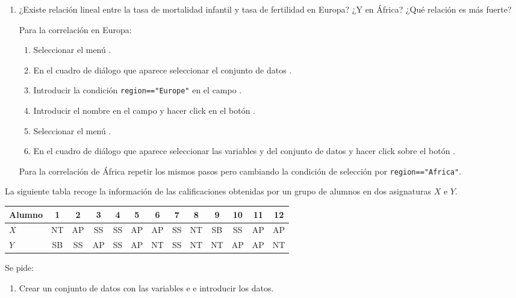 \begin{enumerate}[leftmargin=*]
{\begin{enumerate}
\item ¿Existe relación lineal entre la tasa de mortalidad infantil y tasa de fertilidad en Europa? ¿Y en África? ¿Qué relación es más fuerte?
\begin{indicacion}{
Para la correlación en Europa:
\begin{enumerate}
\item Seleccionar el menú .
\item En el cuadro de diálogo que aparece seleccionar el conjunto de datos .
\item Introducir la condición \lstinline{region=="Europe"} en el campo .
\item Introducir el nombre  en el campo  y hacer click en el botón .
\item Seleccionar el menú .
\item En el cuadro de diálogo que aparece seleccionar las variables  y
 del conjunto de datos  y hacer click sobre el botón .
\end{enumerate}
Para la correlación de África repetir los mismos pasos pero cambiando la condición de selección por
\lstinline{region=="Africa"}.
}
\end{indicacion}
\end{enumerate}


\item La siguiente tabla recoge la información de las calificaciones obtenidas por un grupo de alumnos en dos
asignaturas $X$ e $Y$.
\begin{center}
\begin{tabular}{lcccccccccccc}
Alumno & 1 & 2 & 3 & 4 & 5 & 6 & 7 & 8 & 9 & 10 & 11 & 12\\
\hline
$X$ & NT & AP & SS & SS & AP & AP & SS & NT & SB & SS & AP & AP\\
$Y$ & SB & SS & AP & SS & AP & NT & SS & NT & NT & AP & AP & NT
\end{tabular}
\end{center}
Se pide:
\begin{enumerate}
\item Crear un conjunto de datos con las variables  e  e introducir los datos.


\end{enumerate}}
\end{enumerate}
